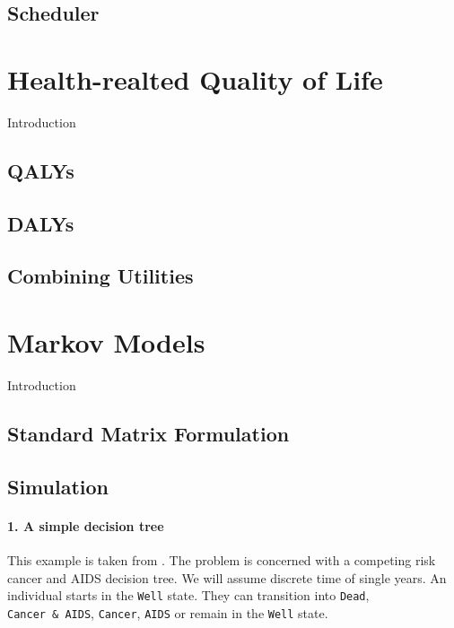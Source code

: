 \documentclass[]{book}
\begin{document}
\hypertarget{scheduler}{%
\section{Scheduler}\label{scheduler}}

\hypertarget{HRQoL}{%
\chapter{Health-realted Quality of Life}\label{HRQoL}}

Introduction

\hypertarget{qalys}{%
\section{QALYs}\label{qalys}}

\hypertarget{dalys}{%
\section{DALYs}\label{dalys}}

\hypertarget{combining-utilities}{%
\section{Combining Utilities}\label{combining-utilities}}

\hypertarget{markov-models}{%
\chapter{Markov Models}\label{markov-models}}

Introduction

\hypertarget{standard-matrix-formulation}{%
\section{Standard Matrix Formulation}\label{standard-matrix-formulation}}

\hypertarget{simulation}{%
\section{Simulation}\label{simulation}}

\hypertarget{C1}{%
\subsubsection{1. A simple decision tree}\label{C1}}

This example is taken from \citet{Hazen2014}.
The problem is concerned with a competing risk cancer and AIDS decision tree.
We will assume discrete time of single years.
An individual starts in the \texttt{Well} state.
They can transition into \texttt{Dead}, \texttt{Cancer\ \&\ AIDS}, \texttt{Cancer}, \texttt{AIDS} or remain in the \texttt{Well} state.
\end{document}
